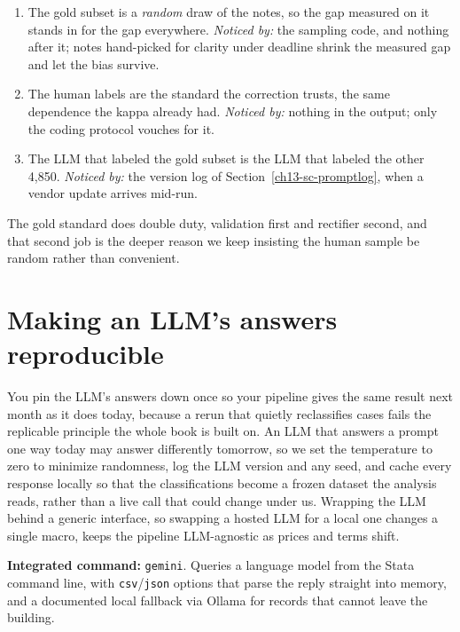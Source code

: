 \documentclass[
    a4paper,
    fontsize=10pt,
    twoside=true,
    numbers=noenddot,
]{kaobook}
\newenvironment{restson}[1][What this depends on]{%
    \begin{restsonbox}[frametitle={#1}]%
}{%
    \end{restsonbox}%
}
\begin{document}
\begin{restson}[What the corrected estimate depends on]
\begin{enumerate}
\item The gold subset is a \emph{random} draw of the notes, so the gap measured on it stands in for the gap everywhere. \emph{Noticed by:} the sampling code, and nothing after it; notes hand-picked for clarity under deadline shrink the measured gap and let the bias survive.
\item The human labels are the standard the correction trusts, the same dependence the kappa already had. \emph{Noticed by:} nothing in the output; only the coding protocol vouches for it.
\item The LLM that labeled the gold subset is the LLM that labeled the other 4,850. \emph{Noticed by:} the version log of Section~\ref{ch13-sc-promptlog}, when a vendor update arrives mid-run.
\end{enumerate}
\end{restson}

The gold standard does double duty, validation first and rectifier second, and that second job is the deeper reason we keep insisting the human sample be random rather than convenient.

\section{Making an LLM's answers reproducible}
You pin the LLM's answers down once so your pipeline gives the same result next month as it does today, because a rerun that quietly reclassifies cases fails the replicable principle the whole book is built on. An LLM that answers a prompt one way today may answer differently tomorrow, so we set the temperature to zero to minimize randomness, log the LLM version and any seed, and cache every response locally so that the classifications become a frozen dataset the analysis reads, rather than a live call that could change under us. Wrapping the LLM behind a generic interface, so swapping a hosted LLM for a local one changes a single macro, keeps the pipeline LLM-agnostic as prices and terms shift.

\begin{kaobox}[frametitle=Package Integration: \texttt{gemini}]
\textbf{Integrated command:} \texttt{gemini}. Queries a language model from the Stata command line, with \texttt{csv}/\texttt{json} options that parse the reply straight into memory, and a documented local fallback via Ollama for records that cannot leave the building.
\end{kaobox}
\end{document}
